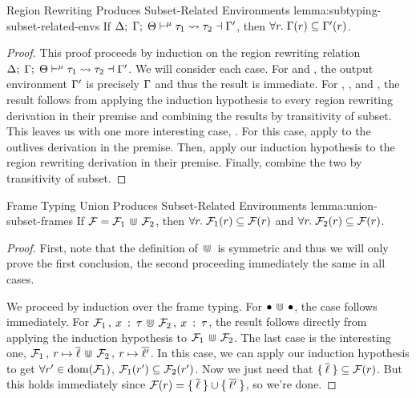 \begin{oxlemma}{Region Rewriting Produces Subset-Related Environments}
  {lemma:subtyping-subset-related-envs}
  If $\Delta; \; \Gamma; \; \Theta \vdash^{\mu} \tau_1 \leadsto \tau_2 \dashv \Gamma^\prime$, then
  $\forall r. \; \Gamma(r) \subseteq \Gamma^\prime(r)$.
\end{oxlemma}

\begin{proof}
  This proof proceeds by induction on the region rewriting relation
  $\Delta; \; \Gamma; \; \Theta \vdash^{\mu} \tau_1 \leadsto \tau_2 \dashv \Gamma^\prime$. We will
  consider each case. For  and , the output
  environment $\Gamma^\prime$ is precisely $\Gamma$ and thus the result is
  immediate. For , ,  and
  , the result follows from applying the induction hypothesis
  to every region rewriting derivation in their premise and combining the
  results by transitivity of subset. This leaves us with one more interesting
  case, . For this case, apply
   to the outlives derivation in the
  premise. Then, apply our induction hypothesis to the region rewriting
  derivation in their premise. Finally, combine the two by transitivity of
  subset.
\end{proof}

\begin{oxlemma}{Frame Typing Union Produces Subset-Related Environments}
  {lemma:union-subset-frames}
  If $\mathcal{F} = \mathcal{F}_1 \, \Cup \, \mathcal{F}_2$, then
  $\forall r. \; \mathcal{F}_1(r) \subseteq \mathcal{F}(r)$ and
  $\forall r. \; \mathcal{F}_2(r) \subseteq \mathcal{F}(r)$.
\end{oxlemma}

\begin{proof}
  First, note that the definition of $\, \Cup \,$ is symmetric and thus we will only
  prove the first conclusion, the second proceeding immediately the same in all cases.

  We proceed by induction over the frame typing. For $\bullet \, \Cup \,
  \bullet$, the case follows immediately. For
  $\mathcal{F}_1 \, , \: x \: : \: \tau \, \Cup \,
  \mathcal{F}_2 \, , \: x \: : \: \tau$, the result follows
  directly from applying the induction hypothesis to $\mathcal{F}_1 \, \Cup \,
  \mathcal{F}_2$. The last case is the interesting one,
  $\mathcal{F}_1 \, , \: r \mapsto \overline{\ell}
  \, \Cup \,
  \mathcal{F}_2 \, , \: r \mapsto \overline{\ell^\prime}$.
  In this case, we can apply our induction hypothesis to get $\forall
  r^\prime \in \textrm{dom}(\mathcal{F}_1)$, $\mathcal{F}_1(r^\prime)
  \subseteq \mathcal{F}_2(r^\prime)$. Now we just need that
  $\{ \: \overline{\ell} \: \} \subseteq \mathcal{F}(r)$. But this holds immediately
  since $\mathcal{F}(r) = \{ \: \overline{\ell} \: \} \cup
  \{ \: \overline{\ell^\prime} \: \}$, so we're done.
\end{proof}

